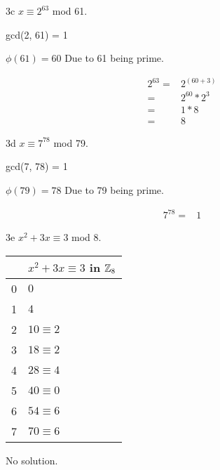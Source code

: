 \begin{question}{3c}
$x \equiv 2^{63}$ mod 61.

gcd(2, 61) = 1

$\phi (61) = 60$ Due to 61 being prime.

\begin{align*}
2^63 =& 2^{(60+3)}\\
=& 2^{60} * 2^3\\
=& 1 * 8\\
=& 8
\end{align*}

\end{question}

\begin{question}{3d}
$x \equiv 7^{78}$ mod 79.

gcd(7, 78) = 1

$\phi (79) = 78$ Due to 79 being prime.

\begin{align*}
7^78 =& 1
\end{align*}
\end{question}

\begin{question}{3e}
$x^2 + 3x \equiv 3$ mod 8.

\begin{tabular}{l|l}
& $x^2 + 3x \equiv 3$ in $\mathbb{Z}_{8}$\\
\hline
0 & $0$\\
1 & $4$\\
2 & $10 \equiv 2$\\
3 & $18 \equiv 2$\\
4 & $28 \equiv 4$\\
5 & $40 \equiv 0$\\
6 & $54 \equiv 6$\\
7 & $70 \equiv 6$
\end{tabular}

No solution.
\end{question}


